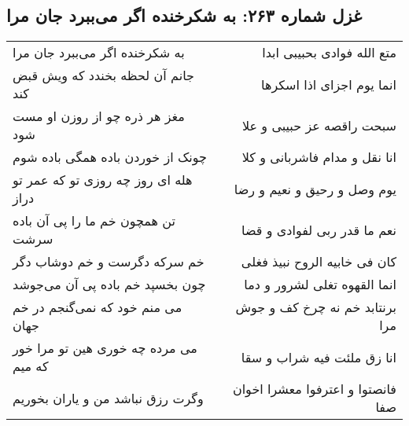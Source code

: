 \begin{center}
\section*{غزل شماره ۲۶۳: به شکرخنده اگر می‌ببرد جان مرا}
\label{sec:0263}
\begin{longtable}{l p{0.5cm} r}
به شکرخنده اگر می‌ببرد جان مرا
&&
متع الله فوادی بحبیبی ابدا
\\
جانم آن لحظه بخندد که ویش قبض کند
&&
انما یوم اجزای اذا اسکرها
\\
مغز هر ذره چو از روزن او مست شود
&&
سبحت راقصه عز حبیبی و علا
\\
چونک از خوردن باده همگی باده شوم
&&
انا نقل و مدام فاشربانی و کلا
\\
هله ای روز چه روزی تو که عمر تو دراز
&&
یوم وصل و رحیق و نعیم و رضا
\\
تن همچون خم ما را پی آن باده سرشت
&&
نعم ما قدر ربی لفوادی و قضا
\\
خم سرکه دگرست و خم دوشاب دگر
&&
کان فی خابیه الروح نبیذ فغلی
\\
چون بخسپد خم باده پی آن می‌جوشد
&&
انما القهوه تغلی لشرور و دما
\\
می منم خود که نمی‌گنجم در خم جهان
&&
برنتابد خم نه چرخ کف و جوش مرا
\\
می مرده چه خوری هین تو مرا خور که میم
&&
انا زق ملئت فیه شراب و سقا
\\
وگرت رزق نباشد من و یاران بخوریم
&&
فانصتوا و اعترفوا معشرا اخوان صفا
\\
\end{longtable}
\end{center}

